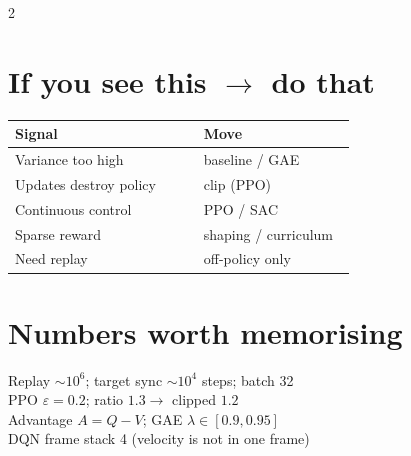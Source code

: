 \documentclass[11pt,a4paper]{article}
\newcommand{\sect}[1]{\section*{#1}}
\begin{document}
\begin{multicols}{2}
\sect{If you see this $\rightarrow$ do that}
\begin{tabular}{@{}p{0.52\linewidth}p{0.42\linewidth}@{}}
\toprule
Signal & Move\\
\midrule
Variance too high & baseline / GAE\\
Updates destroy policy & clip (PPO)\\
Continuous control & PPO / SAC\\
Sparse reward & shaping / curriculum\\
Need replay & off-policy only\\
\bottomrule
\end{tabular}


\sect{Numbers worth memorising}
Replay $\sim10^6$; target sync $\sim10^4$ steps; batch 32\\
PPO $\varepsilon=0.2$; ratio $1.3\to$ clipped $1.2$\\
Advantage $A=Q-V$; GAE $\lambda\in[0.9,0.95]$\\
DQN frame stack 4 (velocity is not in one frame)

\end{multicols}
\end{document}
